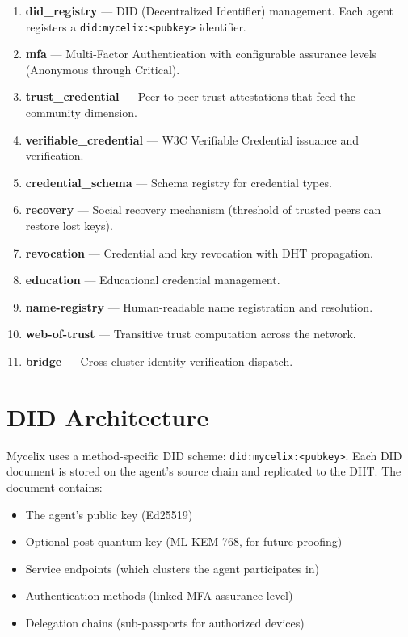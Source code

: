 \documentclass[12pt]{book}
\begin{document}
\begin{enumerate}
  \item \textbf{did\_registry} --- DID (Decentralized Identifier) management.
    Each agent registers a \texttt{did:mycelix:<pubkey>} identifier.
  \item \textbf{mfa} --- Multi-Factor Authentication with configurable assurance
    levels (Anonymous through Critical).
  \item \textbf{trust\_credential} --- Peer-to-peer trust attestations that feed
    the community dimension.
  \item \textbf{verifiable\_credential} --- W3C Verifiable Credential issuance
    and verification.
  \item \textbf{credential\_schema} --- Schema registry for credential types.
  \item \textbf{recovery} --- Social recovery mechanism (threshold of trusted
    peers can restore lost keys).
  \item \textbf{revocation} --- Credential and key revocation with DHT propagation.
  \item \textbf{education} --- Educational credential management.
  \item \textbf{name-registry} --- Human-readable name registration and resolution.
  \item \textbf{web-of-trust} --- Transitive trust computation across the network.
  \item \textbf{bridge} --- Cross-cluster identity verification dispatch.
\end{enumerate}

\section{DID Architecture}

Mycelix uses a method-specific DID scheme: \texttt{did:mycelix:<pubkey>}.
Each DID document is stored on the agent's source chain and replicated to
the DHT. The document contains:

\begin{itemize}
  \item The agent's public key (Ed25519)
  \item Optional post-quantum key (ML-KEM-768, for future-proofing)
  \item Service endpoints (which clusters the agent participates in)
  \item Authentication methods (linked MFA assurance level)
  \item Delegation chains (sub-passports for authorized devices)
\end{itemize}
\end{document}
